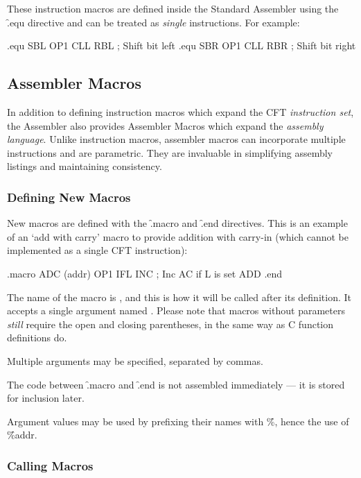 These instruction macros are defined inside the Standard Assembler using the
\f{.equ} directive and can be treated as {\em single} instructions. For example:

\begin{cftasmcode}
.equ   SBL   OP1 CLL RBL   ; Shift bit left
.equ   SBR   OP1 CLL RBR   ; Shift bit right
\end{cftasmcode}



\subsection{Assembler Macros}

In addition to defining instruction macros which expand the CFT {\em
  instruction set}, the Assembler also provides Assembler Macros which expand
the {\em assembly language}. Unlike instruction macros, assembler macros can
incorporate multiple instructions and are parametric. They are invaluable in
simplifying assembly listings and maintaining consistency.

\subsubsection{Defining New Macros}

New macros are defined with the \f{.macro} and \f{.end} directives. This is an
example of an ‘add with carry’ macro to provide addition with carry-in (which
cannot be implemented as a single CFT instruction):

\begin{cftasmcode}
.macro ADC (addr)
    OP1 IFL INC    ; Inc AC if L is set
    ADD %
.end
\end{cftasmcode}

The name of the macro is , and this is how it will be called after its
definition. It accepts a single argument named . Please note that
macros without parameters {\em still} require the open and closing parentheses,
in the same way as C function definitions do.

Multiple arguments may be specified, separated by commas.

The code between \f{.macro} and \f{.end} is not assembled immediately — it is
stored for inclusion later.

Argument values may be used by prefixing their names with \f{\%}, hence the use
of \f{\%addr}.

\subsubsection{Calling Macros}

